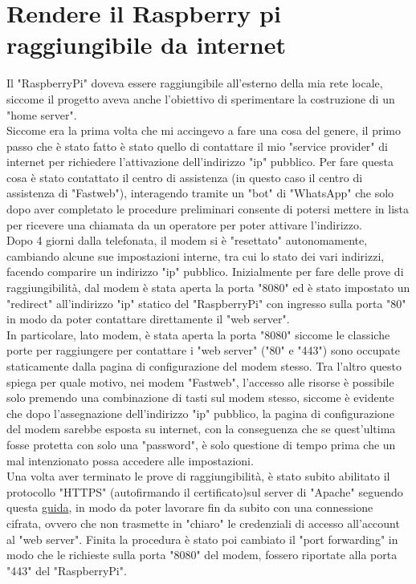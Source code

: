 \section{Rendere il Raspberry pi raggiungibile da internet}\label{sez:Rendere il Raspberry pi raggiungibile da internet}
Il "RaspberryPi" doveva essere raggiungibile all'esterno della mia rete locale, siccome il progetto aveva anche l'obiettivo di sperimentare la costruzione di un "home server".\\
Siccome era la prima volta che mi accingevo a fare una cosa del genere, il primo passo che è stato fatto è stato quello di contattare il mio "service provider" di internet per richiedere l'attivazione dell'indirizzo "ip" pubblico. Per fare questa cosa è stato contattato il centro di assistenza (in questo caso il centro di assistenza di "Fastweb"), interagendo tramite un "bot" di "WhatsApp" che solo dopo aver completato le procedure preliminari consente di potersi mettere in lista per ricevere una chiamata da un operatore per poter attivare l'indirizzo.\\
Dopo 4 giorni dalla telefonata, il modem si è "resettato" autonomamente, cambiando alcune sue impostazioni interne, tra cui lo stato dei vari indirizzi, facendo comparire un indirizzo "ip" pubblico. 
Inizialmente per fare delle prove di raggiungibilità, dal modem è stata aperta la porta "8080" ed è stato impostato un "redirect" all'indirizzo "ip" statico del "RaspberryPi" con ingresso sulla porta "80" in modo da poter contattare direttamente il "web server".\\
In particolare, lato modem, è stata aperta la porta "8080" siccome le classiche porte per raggiungere per contattare i "web server" ("80" e "443") sono occupate staticamente dalla pagina di configurazione del modem stesso. Tra l'altro questo spiega per quale motivo, nei modem "Fastweb", l'accesso alle risorse è possibile solo premendo una combinazione di tasti sul modem stesso, siccome è evidente che dopo l'assegnazione dell'indirizzo "ip" pubblico, la pagina di configurazione del modem sarebbe esposta su internet, con la conseguenza che se quest'ultima fosse protetta con solo una "password", è solo questione di tempo prima che un mal intenzionato possa accedere alle impostazioni.\\
Una volta aver terminato le prove di raggiungibilità, è stato subito abilitato il protocollo "HTTPS" (autofirmando il certificato)sul server di "Apache" seguendo questa \href{https://peppe8o.com/self-signed-certificate-https-in-raspberry-pi-with-apache/}{guida}, in modo da poter lavorare fin da subito con una connessione cifrata, ovvero che non trasmette in "chiaro" le credenziali di accesso all'account al "web server". Finita la procedura è stato poi cambiato il "port forwarding" in modo che le richieste sulla porta "8080" del modem, fossero riportate alla porta "443" del "RaspberryPi".\\
